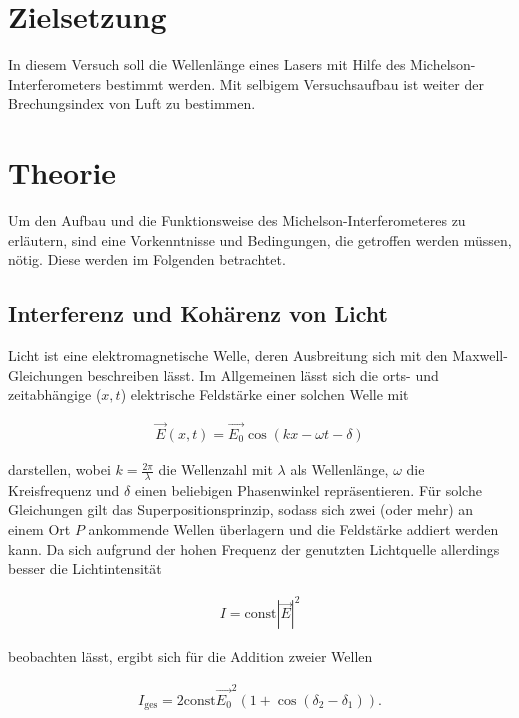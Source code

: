 \section{Zielsetzung}
\label{sec:Zielsetzung}
In diesem Versuch soll die Wellenlänge eines Lasers mit Hilfe des Michelson-Interferometers bestimmt werden.
Mit selbigem Versuchsaufbau ist weiter der Brechungsindex von Luft zu bestimmen.

\section{Theorie}
\label{sec:Theorie}
Um den Aufbau und die Funktionsweise des Michelson-Interferometeres zu erläutern, 
sind eine Vorkenntnisse und Bedingungen, die getroffen werden müssen, nötig. Diese 
werden im Folgenden betrachtet.

\subsection{Interferenz und Kohärenz von Licht}
Licht ist eine elektromagnetische Welle, deren Ausbreitung sich mit den Maxwell-Gleichungen
beschreiben lässt. Im Allgemeinen lässt sich die orts- und zeitabhängige ($x,t$) elektrische Feldstärke einer solchen Welle mit

\begin{align}
\vec{E}(x,t) = \vec{E_\text{0}} \cos(kx - \omega t - \delta)
\end{align}

darstellen, wobei $k = \frac{2\pi}{\lambda}$ die Wellenzahl mit $\lambda$ als Wellenlänge, $\omega$ die Kreisfrequenz
und $\delta$ einen beliebigen Phasenwinkel repräsentieren. Für solche Gleichungen gilt das Superpositionsprinzip,
sodass sich zwei (oder mehr) an einem Ort $P$ ankommende Wellen überlagern und die Feldstärke addiert werden kann.
Da sich aufgrund der hohen Frequenz der genutzten Lichtquelle allerdings besser die Lichtintensität 

\begin{align*}
I = \mathrm{const} |\vec{E}|^{2}
\end{align*}

beobachten lässt, ergibt sich für die Addition zweier Wellen

\begin{align}
I_\text{ges} = 2 \mathrm{const} \vec{E_\text{0}}^{2} (1 + \cos(\delta_\text{2} - \delta_\text{1})).
\end{align}

